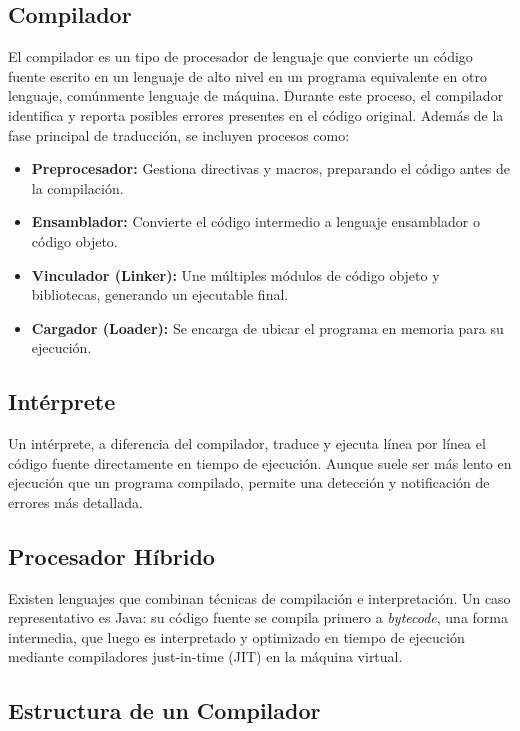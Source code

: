 \documentclass{article}
\begin{document}
\subsection*{Compilador}

El compilador es un tipo de procesador de lenguaje que convierte un código fuente escrito en un lenguaje de alto nivel en un programa equivalente en otro lenguaje, comúnmente lenguaje de máquina. Durante este proceso, el compilador identifica y reporta posibles errores presentes en el código original. Además de la fase principal de traducción, se incluyen procesos como:
\begin{itemize}
    \item \textbf{Preprocesador:} Gestiona directivas y macros, preparando el código antes de la compilación.
    \item \textbf{Ensamblador:} Convierte el código intermedio a lenguaje ensamblador o código objeto.
    \item \textbf{Vinculador (Linker):} Une múltiples módulos de código objeto y bibliotecas, generando un ejecutable final.
    \item \textbf{Cargador (Loader):} Se encarga de ubicar el programa en memoria para su ejecución.
\end{itemize}

\subsection*{Intérprete}

Un intérprete, a diferencia del compilador, traduce y ejecuta línea por línea el código fuente directamente en tiempo de ejecución. Aunque suele ser más lento en ejecución que un programa compilado, permite una detección y notificación de errores más detallada.

\subsection*{Procesador Híbrido}

Existen lenguajes que combinan técnicas de compilación e interpretación. Un caso representativo es Java: su código fuente se compila primero a \textit{bytecode}, una forma intermedia, que luego es interpretado y optimizado en tiempo de ejecución mediante compiladores just-in-time (JIT) en la máquina virtual.

\subsection*{Estructura de un Compilador}
\end{document}
